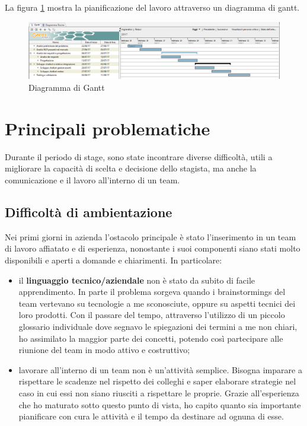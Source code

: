 La figura \ref{gantt} mostra la pianificazione del lavoro attraverso un \gls{diagramma di gantt}.
\begin{figure}[h]
	\centering
	\includegraphics[scale=0.4]{../Immagini/gantt.png}
	\caption{Diagramma di Gantt}\label{gantt}
\end{figure}

\section{Principali problematiche}
Durante il periodo di stage, sono state incontrare diverse difficoltà, utili a migliorare la capacità di scelta e decisione dello stagista, ma anche la comunicazione e il lavoro all'interno di un team.

\subsection{Difficoltà di ambientazione}
Nei primi giorni in azienda l'ostacolo principale è stato l'inserimento in un team di lavoro affiatato e di esperienza, nonostante i suoi componenti siano stati molto disponibili e aperti a domande e chiarimenti. In particolare:
\begin{itemize}
	\item il \textbf{linguaggio tecnico/aziendale} non è stato da subito di facile apprendimento. In parte il problema sorgeva quando i \glspl{brainstorming} del team vertevano su tecnologie a me sconosciute, oppure su aspetti tecnici dei loro prodotti. Con il passare del tempo, attraverso l'utilizzo di un piccolo glossario individuale dove segnavo le spiegazioni dei termini a me non chiari, ho assimilato la maggior parte dei concetti, potendo così partecipare alle riunione del team in modo attivo e costruttivo;
	\item lavorare all'interno di un team non è un'attività semplice. Bisogna imparare a rispettare le scadenze nel rispetto dei colleghi e saper elaborare strategie nel caso in cui essi non siano riusciti a rispettare le proprie. Grazie all'esperienza che ho maturato sotto questo punto di vista, ho capito quanto sia importante pianificare con cura le attività e il tempo da destinare ad ognuna di esse.
\end{itemize}

